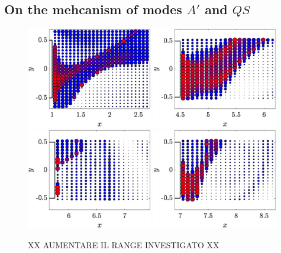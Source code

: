 \subsection{On the mehcanism of modes $A'$ and $QS$}

\begin{figure}
  \centering
  \includegraphics[width=0.49\textwidth]{./fig/LagTrac/part_AR1_Re200.eps}
  \includegraphics[width=0.49\textwidth]{./fig/LagTrac/part_AR4p5_Re410.eps}
  \includegraphics[width=0.49\textwidth]{./fig/LagTrac/part_AR5p75_Re550.eps}
  \includegraphics[width=0.49\textwidth]{./fig/LagTrac/part_AR7_Re500.eps}  
  \caption{XX AUMENTARE IL RANGE INVESTIGATO XX}
  \label{fig:part_res}
\end{figure}    

